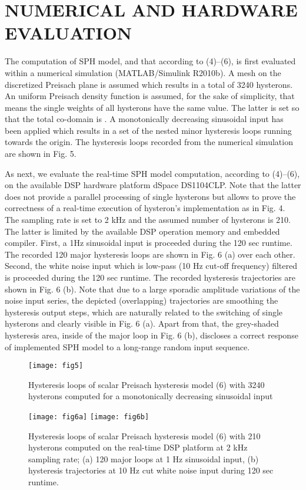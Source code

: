 \documentclass[journal]{IEEEtran}
\begin{document}
\section{NUMERICAL AND HARDWARE EVALUATION}
\label{sec:3}


The computation of SPH model, and that according to (4)--(6), is
first evaluated within a numerical simulation (MATLAB/Simulink
R2010b). A  mesh on the discretized Preisach plane
is assumed which results in a total of 3240 hysterons. An uniform
Preisach density function is assumed, for the sake of simplicity,
that means the single weights of all hysterons have the same
value. The latter is set so that the total co-domain is . A monotonically decreasing sinusoidal input has been
applied which results in a set of the nested minor hysteresis
loops running towards the  origin. The hysteresis loops
recorded from the numerical simulation are shown in Fig. 5.

As next, we evaluate the real-time SPH model computation,
according to (4)--(6), on the available DSP hardware platform
dSpace DS1104CLP. Note that the latter does not provide a parallel
processing of single hysterons but allows to prove the correctness
of a real-time execution of hysteron's implementation as in Fig.
4. The sampling rate is set to 2 kHz and the assumed number of
hysterons is 210. The latter is limited by the available DSP
operation memory and embedded compiler. First, a 1Hz sinusoidal
input is proceeded during the 120 sec runtime. The recorded 120
major hysteresis loops are shown in Fig. 6 (a) over each other.
Second, the white noise input which is low-pass (10 Hz cut-off
frequency) filtered is proceeded during the 120 sec runtime. The
recorded hysteresis trajectories are shown in Fig. 6 (b). Note
that due to a large sporadic amplitude variations of the noise
input series, the depicted (overlapping) trajectories are
smoothing the hysteresis output steps, which are naturally related
to the switching of single hysterons and clearly visible in Fig. 6
(a). Apart from that, the grey-shaded hysteresis area, inside of
the major loop in Fig. 6 (b), discloses a correct response of
implemented SPH model to a long-range random input sequence.
\begin{figure}[!h]
\centering
\texttt{[image: fig5]}
\caption{Hysteresis loops of scalar Preisach hysteresis model (6)
with 3240 hysterons computed for a monotonically decreasing
sinusoidal input} \label{fig:5}
\end{figure}
\begin{figure}[!h]
\centering
\texttt{[image: fig6a]}
\texttt{[image: fig6b]}
\caption{Hysteresis loops of scalar Preisach hysteresis model (6)
with 210 hysterons computed on the real-time DSP platform at 2 kHz
sampling rate; (a) 120 major loops at 1 Hz sinusoidal input, (b)
hysteresis trajectories at 10 Hz cut white noise input during 120
sec runtime.} \label{fig:6}
\end{figure}
\end{document}
